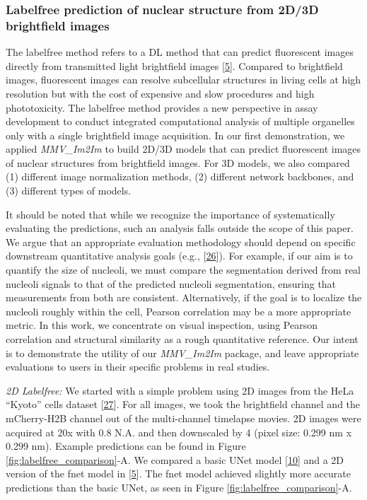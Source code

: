\hypertarget{labelfree-prediction-of-nuclear-structure-from-2d3d-brightfield-images}{%
\subsubsection{Labelfree prediction of nuclear structure from 2D/3D brightfield images}\label{labelfree-prediction-of-nuclear-structure-from-2d3d-brightfield-images}}

The labelfree method refers to a DL method that can predict fluorescent images directly from transmitted light brightfield images {[}\protect\hyperlink{ref-Yq8wZ6hc}{5}{]}. Compared to brightfield images, fluorescent images can resolve subcellular structures in living cells at high resolution but with the cost of expensive and slow procedures and high phototoxicity. The labelfree method provides a new perspective in assay development to conduct integrated computational analysis of multiple organelles only with a single brightfield image acquisition. In our first demonstration, we applied \emph{MMV\_Im2Im} to build 2D/3D models that can predict fluorescent images of nuclear structures from brightfield images. For 3D models, we also compared (1) different image normalization methods, (2) different network backbones, and (3) different types of models.

It should be noted that while we recognize the importance of systematically evaluating the predictions, such an analysis falls outside the scope of this paper. We argue that an appropriate evaluation methodology should depend on specific downstream quantitative analysis goals (e.g., {[}\protect\hyperlink{ref-C2iqR6xE}{26}{]}). For example, if our aim is to quantify the size of nucleoli, we must compare the segmentation derived from real nucleoli signals to that of the predicted nucleoli segmentation, ensuring that measurements from both are consistent. Alternatively, if the goal is to localize the nucleoli roughly within the cell, Pearson correlation may be a more appropriate metric. In this work, we concentrate on visual inspection, using Pearson correlation and structural similarity as a rough quantitative reference. Our intent is to demonstrate the utility of our \emph{MMV\_Im2Im} package, and leave appropriate evaluations to users in their specific problems in real studies.

\emph{2D Labelfree:} We started with a simple problem using 2D images from the HeLa ``Kyoto'' cells dataset {[}\protect\hyperlink{ref-xv2VIyRP}{27}{]}. For all images, we took the brightfield channel and the mCherry-H2B channel out of the multi-channel timelapse movies. 2D images were acquired at 20x with 0.8 N.A. and then downscaled by 4 (pixel size: 0.299 nm x 0.299 nm). Example predictions can be found in Figure \ref{fig:labelfree_comparison}-A. We compared a basic UNet model {[}\protect\hyperlink{ref-TutLhFSz}{10}{]} and a 2D version of the fnet model in {[}\protect\hyperlink{ref-Yq8wZ6hc}{5}{]}. The fnet model achieved slightly more accurate predictions than the basic UNet, as seen in Figure \ref{fig:labelfree_comparison}-A.

